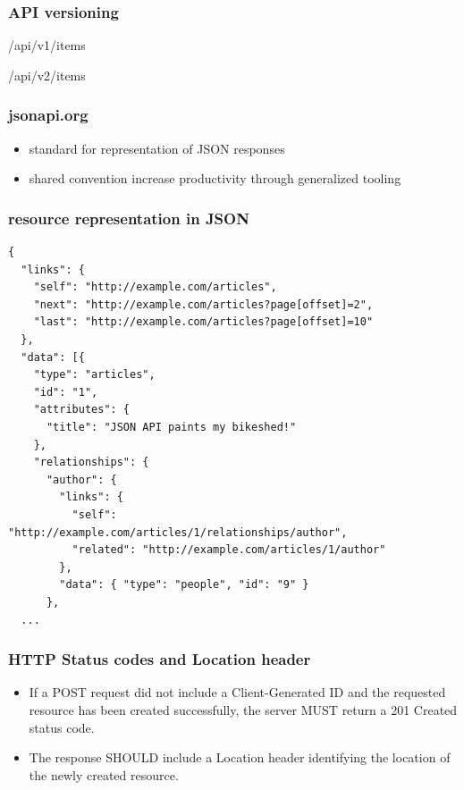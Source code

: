 \documentclass[aspectratio=169]{beamer}
\begin{document}
\begin{frame}[fragile]
  \frametitle{API versioning}

  /api/v1/items

  /api/v2/items
  
\end{frame}

\begin{frame}[fragile]
  \frametitle{jsonapi.org}

  \begin{itemize}
  \item standard for representation of JSON responses
  \item shared convention increase productivity through generalized tooling
  \end{itemize}
  
\end{frame}

\begin{frame}[fragile]
  \frametitle{resource representation in JSON}

  \begin{Verbatim}[fontsize=\tiny]
  {
  "links": {
    "self": "http://example.com/articles",
    "next": "http://example.com/articles?page[offset]=2",
    "last": "http://example.com/articles?page[offset]=10"
  },
  "data": [{
    "type": "articles",
    "id": "1",
    "attributes": {
      "title": "JSON API paints my bikeshed!"
    },
    "relationships": {
      "author": {
        "links": {
          "self": "http://example.com/articles/1/relationships/author",
          "related": "http://example.com/articles/1/author"
        },
        "data": { "type": "people", "id": "9" }
      },
  ...
  \end{Verbatim}


\end{frame}

\begin{frame}[fragile]
  \frametitle{HTTP Status codes and Location header}

  \begin{itemize}
  \item If a POST request did not include a Client-Generated ID and
    the requested resource has been created successfully, the server
    MUST return a 201 Created status code.

  \item The response SHOULD include a Location header identifying the
    location of the newly created resource.
  \end{itemize}

\end{frame}
\end{document}
